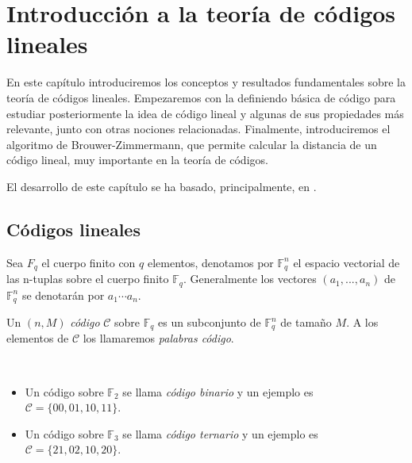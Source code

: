 
\chapter{Introducción a la teoría de códigos lineales}
\label{cap:2}

En este capítulo introduciremos los conceptos y resultados fundamentales sobre la teoría de códigos lineales. Empezaremos con la definiendo básica de código para estudiar posteriormente la idea de código lineal y algunas de sus propiedades más relevante, junto con otras nociones relacionadas. Finalmente, introduciremos el algoritmo de Brouwer-Zimmermann, que permite calcular la distancia de un código lineal, muy importante en la teoría de códigos. 

El desarrollo de este capítulo se ha basado, principalmente, en \cite[Capítulo 1]{Huffman_Pless_2010}.

\section{Códigos lineales}

Sea $F_q$ el cuerpo finito con $q$ elementos, denotamos por $\mathbb{F}_q^n$ el espacio vectorial de las n-tuplas sobre el cuerpo finito $\mathbb{F}_q$. Generalmente los vectores $(a_1, ..., a_n)$ de $\mathbb{F}_q^n$ se denotarán por $a_1 \cdots a_n$.

\begin{definition}
    Un $(n, M)$ \emph{código} $\mathcal{C}$ sobre $\mathbb{F}_q$ es un subconjunto de 
    $\mathbb{F}_q^n$ de tamaño $M$. A los elementos de $\mathcal{C}$ los llamaremos \emph{palabras código}.
\end{definition}

\begin{exampleth}
    $ $
    \begin{itemize}
        \item Un código sobre $\mathbb{F}_2$ se llama \emph{código binario} y un ejemplo es $\mathcal{C} = \{00, 01, 10, 11\}$.
        \item Un código sobre $\mathbb{F}_3$ se llama \emph{código ternario} y un ejemplo es $\mathcal{C} = \{21, 02, 10, 20\}$.
    \end{itemize}
\end{exampleth}

